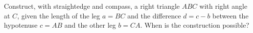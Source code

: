 Construct, with straightedge and compass, a right triangle $ABC$ with right angle at $C$, given the length of the leg $a=BC$ and the difference $d=c-b$ between the hypotenuse $c=AB$ and the other leg $b=CA$. When is the construction possible?
